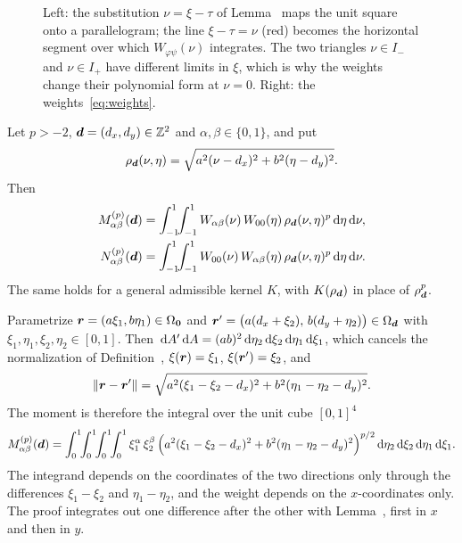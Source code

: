 \begin{figure}[ht]
    \centering
    
    \caption{Left: the substitution $\nu=\xi-\tau$ of Lemma~ maps the unit square onto a
    parallelogram; the line $\xi-\tau=\nu$ (red) becomes the horizontal segment over which $W_{\varphi\psi}(\nu)$
    integrates. The two triangles $\nu\in I_-$ and $\nu\in I_+$ have different limits in $\xi$, which is why the
    weights change their polynomial form at $\nu=0$. Right: the weights~\eqref{eq:weights}.}
    \label{fig:correlation}
\end{figure}

 Let $p>-2$, $\vb*{d}=(d_x,d_y)\in\mathbb{Z}^2$ and
$\alpha,\beta\in\{0,1\}$, and put
\begin{equation}
    \rho_{\vb*{d}}(\nu,\eta) = \sqrt{a^2(\nu-d_x)^2+b^2(\eta-d_y)^2}.
\end{equation}
Then
\begin{equation}
    \label{eq:reduction}
    \begin{aligned}
    M^{(p)}_{\alpha\beta}(\vb*{d}) &= \int_{-1}^{1}\!\!\int_{-1}^{1} W_{\alpha\beta}(\nu)\,W_{00}(\eta)\,
        \rho_{\vb*{d}}(\nu,\eta)^p\,\mathrm{d}\eta\,\mathrm{d}\nu,\\
    N^{(p)}_{\alpha\beta}(\vb*{d}) &= \int_{-1}^{1}\!\!\int_{-1}^{1} W_{00}(\nu)\,W_{\alpha\beta}(\eta)\,
        \rho_{\vb*{d}}(\nu,\eta)^p\,\mathrm{d}\eta\,\mathrm{d}\nu .
    \end{aligned}
\end{equation}
The same holds for a general admissible kernel $K$, with $K(\rho_{\vb*{d}})$ in place of $\rho_{\vb*{d}}^p$.

\vspace{\baselineskip}
\proof Parametrize $\vb*{r}=(a\xi_1,b\eta_1)\in\Omega_{\vb*{0}}$ and $\vb*{r}'=\bigl(a(d_x+\xi_2),\,b(d_y+\eta_2)\bigr)\in\Omega_{\vb*{d}}$
with $\xi_1,\eta_1,\xi_2,\eta_2\in[0,1]$. Then $\,\mathrm{d} A'\,\mathrm{d} A=(ab)^2\,\mathrm{d}\eta_2\,\mathrm{d}\xi_2\,\mathrm{d}\eta_1\,\mathrm{d}\xi_1$, which cancels the
normalization of Definition~, $\xi(\vb*{r})=\xi_1$, $\xi(\vb*{r}')=\xi_2$, and
\begin{equation}
    \left\| \vb*{r}-\vb*{r}' \right\| = \sqrt{a^2(\xi_1-\xi_2-d_x)^2+b^2(\eta_1-\eta_2-d_y)^2}.
\end{equation}
The moment is therefore the integral over the unit cube $[0,1]^4$
\begin{equation}
    \label{eq:fourfold}
    M^{(p)}_{\alpha\beta}(\vb*{d}) = \int_0^1\!\!\int_0^1\!\!\int_0^1\!\!\int_0^1
    \xi_1^{\alpha}\,\xi_2^{\beta}\,\Bigl(a^2(\xi_1-\xi_2-d_x)^2+b^2(\eta_1-\eta_2-d_y)^2\Bigr)^{p/2}
    \,\mathrm{d}\eta_2\,\mathrm{d}\xi_2\,\mathrm{d}\eta_1\,\mathrm{d}\xi_1 .
\end{equation}
The integrand depends on the coordinates of the two directions only through the differences $\xi_1-\xi_2$ and
$\eta_1-\eta_2$, and the weight depends on the $x$-coordinates only. The proof integrates out one difference after the
other with Lemma~, first in $x$ and then in $y$.

